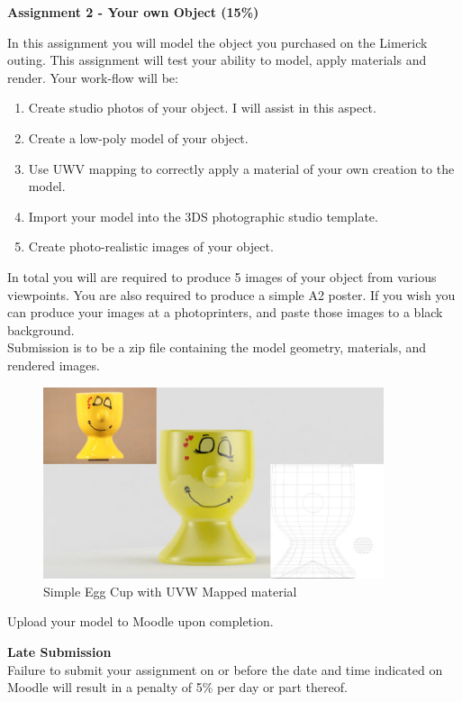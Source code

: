 

\begin{flushleft}
\Large\textbf{Assignment 2 - Your own Object (15\%)}\\
\end{flushleft}

In this assignment you will model the object you purchased on the Limerick outing.  This assignment will test your ability to model, apply materials and render.  Your work-flow will be:
\begin{enumerate}
	\item Create studio photos of your object. I will assist in this aspect.
	\item Create a low-poly model of your object.
	\item Use UWV mapping to correctly apply a material of your own creation to the model.
	\item Import your model into the 3DS photographic studio template.
	\item Create photo-realistic images of your object.
\end{enumerate}

In total you will are required to produce 5 images of your object from various viewpoints.  You are also required to produce a simple A2 poster.  If you wish you can produce your images at a photoprinters, and paste those images to a black background.\\

Submission is to be a zip file containing the model geometry, materials, and rendered images.\\

\begin{figure}[hb]
	\centering
		\includegraphics[width=10cm]{img/eggcup.jpg}
		\caption{Simple Egg Cup with UVW Mapped material}
	\label{fig:Egg Cup}
\end{figure}

Upload your model to Moodle upon completion.

\textbf{Late Submission}\\
Failure to submit your assignment on or before the date and time indicated on Moodle will result in a penalty of 5\% per day or part thereof.

